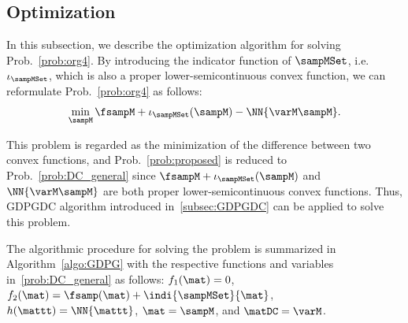 \documentclass[journal]{IEEEtran}
\begin{document}
\subsection{Optimization}
In this subsection, we describe the optimization algorithm for solving Prob.~\eqref{prob:org4}.
By introducing the indicator function of $\sampMSet$, i.e. $\iota_{\sampMSet}$, which is also a proper lower-semicontinuous convex function, we can reformulate Prob.~\eqref{prob:org4} as follows:
\begin{align}\label{prob:proposed}
    \min_{\sampM} \fsampM + \iota_{\sampMSet}(\sampM) - \NN{\varM \sampM}.
\end{align}

This problem is regarded as the minimization of the difference between two convex functions, and Prob.~\eqref{prob:proposed} is reduced to Prob.~\eqref{prob:DC_general} since $\fsampM + \iota_{\sampMSet}(\sampM)$ and $\NN{\varM \sampM}$ are both proper lower-semicontinuous convex functions.
Thus, GDPGDC algorithm introduced in~\ref{subsec:GDPGDC} can be applied to solve this problem.

The algorithmic procedure for solving the problem is summarized in Algorithm~\ref{algo:GDPG} with the respective functions and variables in~\eqref{prob:DC_general} as follows: $f_1(\mat) = 0$, $f_2(\mat) = \fsamp(\mat) + \indi{\sampMSet}{\mat}$, $h(\mattt) = \NN{\mattt}$, $\mat = \sampM$, and $\matDC = \varM$.
\end{document}
